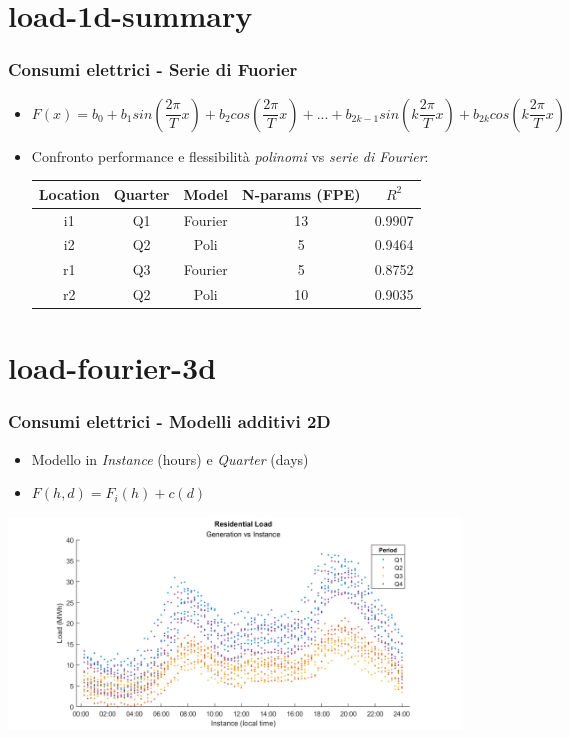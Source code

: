 \documentclass{beamer}
\begin{document}
\section{load-1d-summary}
\begin{frame}
    \frametitle{Consumi elettrici - Serie di Fuorier}   
    \begin{itemize}
        \item $F(x)=b_0+
	b_1sin\left(\dfrac{2\pi}{T}x\right)+b_2cos\left(\dfrac{2\pi}{T}x\right)+...+
	b_{2k-1}sin\left(k\dfrac{2\pi}{T}x\right)+b_{2k}cos\left(k\dfrac{2\pi}{T}x\right)$  
        \vspace{0.7cm}
        \item Confronto performance e flessibilità \textit{polinomi} vs \textit{serie di Fourier}: \\
        \vspace{0.3cm}
        \begin{tabular}{|c|c|c|c|c|}
            \hline
            \textbf{Location} & \textbf{Quarter} & \textbf{Model} & \textbf{N-params (FPE)} & \textbf{$R^2$} \\
            \hline
             i1 &    Q1 &    Fourier &     13 &     0.9907 \\
             i2 &     Q2 &    Poli &      5 &     0.9464 \\
             r1 &    Q3 &     Fourier &      5 &     0.8752 \\
             r2 &     Q2 &     Poli &      10 &     0.9035 \\
            \hline
        \end{tabular}
    \end{itemize}
    \vfill
\end{frame}

\section{load-fourier-3d}
\begin{frame}
    \frametitle{Consumi elettrici - Modelli additivi 2D}   
    \begin{itemize}
        \item Modello in \textit{Instance} (hours) e \textit{Quarter} (days)
        \item $F(h, d)=F_i(h)+c(d)$
    \end{itemize}
    \vspace{1cm} %
    \vfill
    
    \centering
    \includegraphics[width=0.9\textwidth,keepaspectratio]{all_residenzial_load_period.png} 
\end{frame}
\end{document}
